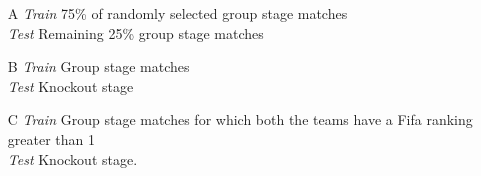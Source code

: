 \documentclass{statsoc}
\begin{document}
\begin{enumerate}
\item[A] \emph{Train} 75\% of randomly selected group stage matches \\
\emph{Test}  Remaining 25\% group stage matches
\item[B] \emph{Train}  Group stage matches\\
 \emph{Test}  Knockout stage 
 \item[C] \emph{Train} Group stage matches for which both the teams have a Fifa ranking greater than 1 \\
   \emph{Test}  Knockout stage.
\end{enumerate}

\begin{center}
\begin{figure}
~
\\

\end{figure}
\end{center}
\end{document}
